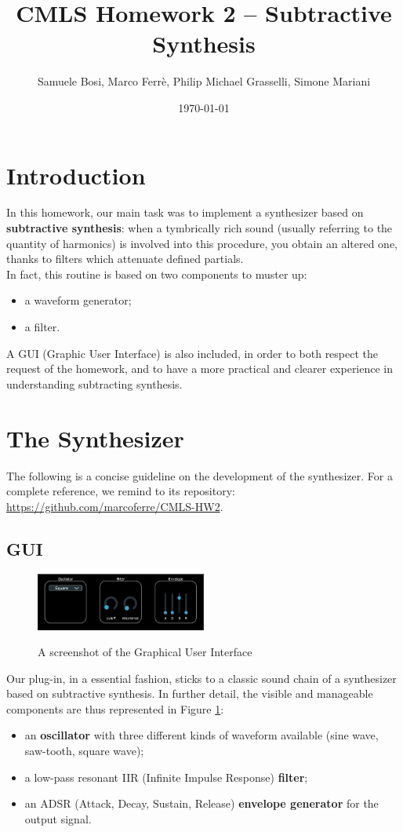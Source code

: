 \documentclass[11pt]{article}
\author{Samuele Bosi, Marco Ferrè, Philip Michael Grasselli, Simone Mariani}
\title{\textbf{CMLS Homework 2 – Subtractive Synthesis}}
\date{\today}
\begin{document}
\maketitle
\tableofcontents

\section{Introduction}
In this homework, our main task was to implement a synthesizer based on \textbf{subtractive synthesis}: when a tymbrically rich sound (usually referring to the quantity of harmonics) is involved into this procedure, you obtain an altered one, thanks to filters which attenuate defined partials. \\
In fact, this routine is based on two components to muster up:
\begin{itemize}
\item a waveform generator;
\item a filter.
\end{itemize}
A GUI (Graphic User Interface) is also included, in order to both respect the request of the homework, and to have a more practical and clearer experience in understanding subtracting synthesis.

\section{The Synthesizer}
The following is a concise guideline on the development of the synthesizer. For a complete reference, we remind to its repository: \url{https://github.com/marcoferre/CMLS-HW2}.

\subsection{GUI}
\begin{figure}
\centering
\includegraphics[width=0.5\textwidth]{GUI.png}
\label{fig:GUI}
\caption{A screenshot of the Graphical User Interface}
\end{figure}
Our plug-in, in a essential fashion, sticks to a classic sound chain of a synthesizer based on subtractive synthesis. In further detail, the visible and manageable components are thus represented in Figure \ref{fig:GUI}:
\begin{itemize}
\item an \textbf{oscillator} with three different kinds of waveform available (sine wave, saw-tooth, square wave);
\item a low-pass resonant IIR (Infinite Impulse Response) \textbf{filter};
\item an ADSR (Attack, Decay, Sustain, Release) \textbf{envelope generator} for the output signal.
\end{itemize}
\end{document}
